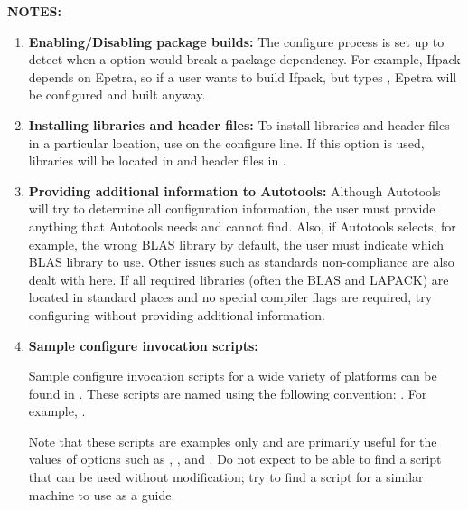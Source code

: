 {\bf NOTES:} 
\begin{enumerate}
\item {\bf Enabling/Disabling package builds:} 
The configure process is set up to detect when a 
 option would break a package dependency.  
For example, Ifpack depends on Epetra, so if a user wants to build Ifpack, but 
types , Epetra will be configured and built 
anyway.  

\item {\bf Installing libraries and header files:}
To install libraries and header files in a particular location, 
use  on the configure line.  If this option is 
used, libraries will be located in  and header files in 
.

\item {\bf Providing additional information to Autotools:}
Although Autotools will try to determine all configuration
information, the user must provide anything that Autotools needs and 
cannot find.  Also, if Autotools selects, for example, the wrong 
BLAS library by default, the user must indicate which BLAS library to use.  
Other issues such as standards 
non-compliance are also dealt with here.  If all required libraries (often 
the BLAS and LAPACK) are located in standard places and no special 
compiler flags are required, try configuring without
providing additional information.

\item {\bf Sample configure invocation scripts:}

\begin{minipage}[c]{\textwidth}
\begin{minipage}[l]{.6\textwidth}

Sample configure invocation scripts for a wide variety of platforms can be 
found in .  These scripts are 
named using the following convention: .
For example, .  
\end{minipage}\hfill
{}
\end{minipage}

Note that these scripts 
are examples only and are primarily useful for the values of options such as 
, , 
and .  Do not expect to be able to find a 
script that can be used without modification; try to find a script for a 
similar machine to use as a guide.  


\end{enumerate}
